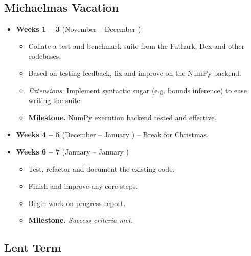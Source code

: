 \subsection{Michaelmas Vacation}

\begin{itemize}
    \item \textbf{Weeks 1 -- 3} (November  -- December ) \begin{itemize}
        \item Collate a test and benchmark suite from the Futhark, Dex and other codebases.
        \item Based on testing feedback, fix and improve on the NumPy backend.
        \item \textit{Extensions.} Implement syntactic sugar (e.g. bounds inference) to ease writing the suite. 
        \item \textbf{Milestone.} NumPy execution backend tested and effective.
    \end{itemize}

    \item \textbf{Weeks 4 -- 5} (December  -- January ) -- Break for Christmas.

    \item \textbf{Weeks 6 -- 7} (January  -- January ) \begin{itemize}
        \item Test, refactor and document the existing code.
        \item Finish and improve any core steps.
        \item Begin work on progress report.
        \item \textbf{Milestone.} \textit{Success criteria met.}
    \end{itemize}
\end{itemize}

\subsection{Lent Term}

